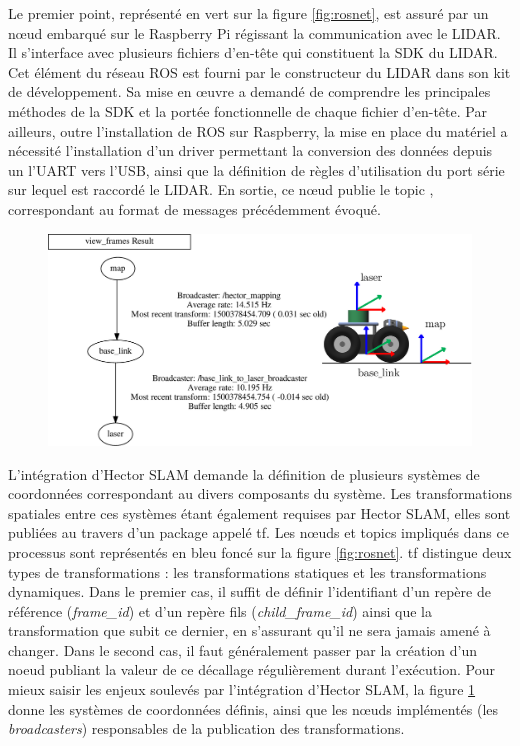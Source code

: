 Le premier point, représenté en vert sur la figure \ref{fig:rosnet}, est assuré par un n\oe{}ud embarqué sur le Raspberry Pi régissant la communication avec le \gls{LIDAR}.   
Il s'interface avec plusieurs fichiers d'en-tête qui constituent la \gls{SDK} du \gls{LIDAR}.
Cet élément du réseau \gls{ROS} est fourni par le constructeur du \gls{LIDAR} dans son kit de développement.
Sa mise en \oe{}uvre a demandé de comprendre les principales méthodes de la \gls{SDK} et la portée fonctionnelle de chaque fichier d'en-tête. 
Par ailleurs, outre l'installation de \gls{ROS} sur Raspberry, la mise en place du matériel a nécessité l'installation d'un driver permettant la conversion des données 
depuis un l'UART vers l'USB, ainsi que la définition de règles d'utilisation du port série sur lequel est raccordé le \gls{LIDAR}.
En sortie, ce n\oe{}ud publie le topic , correspondant au format de messages  précédemment évoqué. 

\begin{figure}[h]
  \centering
    \includegraphics[width=1.\linewidth]{figures/frames_and_schema}  
  \label{fig:frames}
\end{figure}

L'intégration d'Hector SLAM demande la définition de plusieurs systèmes de coordonnées correspondant au divers composants du système.
Les transformations spatiales entre ces systèmes étant également requises par \gls{Hector SLAM}, elles sont publiées au travers d'un package appelé \gls{tf}\cite{Bib_ROS_tf}\cite{Bib_tf}. 
Les n\oe{}uds et topics impliqués dans ce processus sont représentés en bleu foncé sur la figure \ref{fig:rosnet}. 
\gls{tf} distingue deux types de transformations : les transformations statiques et les transformations dynamiques. 
Dans le premier cas, il suffit de définir l'identifiant d'un repère de référence (\emph{frame\_id}) et d'un repère fils (\emph{child\_frame\_id}) ainsi que la transformation que subit ce dernier, en s'assurant qu'il ne sera jamais amené à changer.
Dans le second cas, il faut généralement passer par la création d'un noeud publiant la valeur de ce décallage régulièrement durant l'exécution. 
Pour mieux saisir les enjeux soulevés par l'intégration d'\gls{Hector SLAM}, la figure \ref{fig:frames} donne les systèmes de coordonnées définis, 
ainsi que les n\oe{}uds implémentés (les \emph{broadcasters}) responsables de la publication des transformations. 

